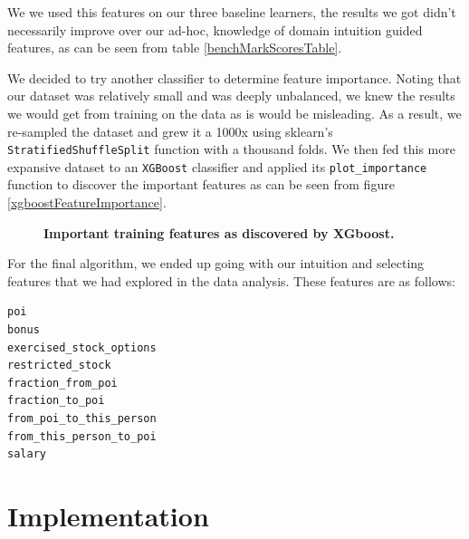 \documentclass[twoside,openright,titlepage,numbers=noenddot,headinclude,%
               footinclude=true,cleardoublepage=empty,abstractoff,BCOR=5mm,%
               paper=a4,fontsize=11pt,ngerman,american]{scrreprt}
\numberwithin{theorem}{chapter}
\numberwithin{definition}{chapter}
\numberwithin{algorithm}{chapter}
\numberwithin{figure}{chapter}
\numberwithin{table}{chapter}
\numberwithin{equation}{chapter}
\begin{document}
We we used this features on our three baseline learners, the results we got didn't necessarily improve over our ad-hoc, knowledge of domain intuition guided features, as can be seen from table \ref{benchMarkScoresTable}.

We decided to try another classifier to determine feature importance. Noting that our dataset was relatively small and was deeply unbalanced, we knew the results we would get from training on the data as is would be misleading. As a result, we re-sampled the dataset and grew it a 1000x using sklearn's \texttt{StratifiedShuffleSplit} function with a thousand folds. We then fed this more expansive dataset to an \texttt{XGBoost} classifier and applied its \texttt{plot\_importance} function to discover the important features as can be seen from figure \ref{xgboostFeatureImportance}.

\begin{figure}[!hbtp]
\centering
    
    \caption{\textbf{Important training features as discovered by XGboost.} \textit{}}
\end{figure}


For the final algorithm, we ended up going with our intuition and selecting features that we had explored in the data analysis. These features are as follows: 
\begin{verbatim}
poi
bonus
exercised_stock_options
restricted_stock
fraction_from_poi
fraction_to_poi
from_poi_to_this_person
from_this_person_to_poi
salary
\end{verbatim}


\section*{Implementation}
\end{document}
